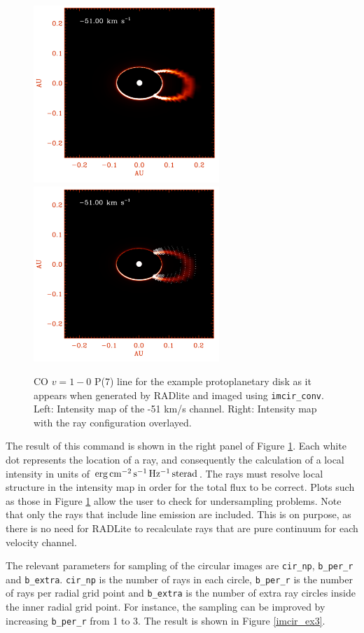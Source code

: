 \documentclass[11pt]{article}
\begin{document}
\begin{figure}
\centering
\includegraphics[width=7cm]{imcir_conv_ex1.pdf}
\includegraphics[width=7cm]{imcir_conv_ex2.pdf}
\caption{CO $v=1-0$ P(7) line for the example protoplanetary disk as it appears when generated by RADlite and imaged using {\tt imcir\_conv}.
Left: Intensity map of the -51 km/s channel. Right: Intensity map with the ray configuration overlayed.  }
\label{imcir_ex1}
\end{figure}

The result of this command is shown in the right panel of Figure \ref{imcir_ex1}. Each white dot represents the location of a ray, and consequently the calculation
of a local intensity in units of $\rm erg\,cm^{-2}\,s^{-1}\,Hz^{-1}\,sterad$. The rays must resolve local structure in the intensity map in order for the total flux
to be correct. Plots such as those in Figure \ref{imcir_ex1} allow the user to check for undersampling problems. Note that only the rays that include line emission are
included. This is on purpose, as there is no need for RADLite to recalculate rays that are pure continuum for each velocity channel.

The relevant parameters for sampling of the circular images are {\tt cir\_np}, {\tt b\_per\_r} and {\tt b\_extra}. {\tt cir\_np} is the number of rays in each circle, 
{\tt b\_per\_r} is the number of rays per radial grid point and {\tt b\_extra} is the number of extra ray circles inside the inner radial grid point. For instance, 
the sampling can be improved by increasing {\tt b\_per\_r} from 1 to 3. The result is shown in Figure \ref{imcir_ex3}. 
\end{document}
